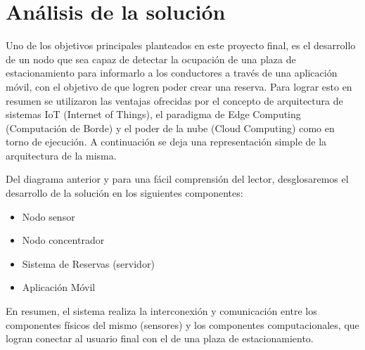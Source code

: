 \newpage
\section{Análisis de la solución}
Uno de los objetivos principales planteados en este proyecto final, es el desarrollo de un nodo que sea capaz de detectar la ocupación de una plaza de estacionamiento para informarlo a los conductores a través de una aplicación móvil, con el objetivo de que logren poder crear una reserva. Para lograr esto en resumen se utilizaron las ventajas ofrecidas por el concepto de arquitectura de sistemas IoT (Internet of Things), el paradigma de Edge Computing (Computación de Borde) y el poder de la nube (Cloud Computing) como en torno de ejecución. A continuación se deja una representación simple de la arquitectura de la misma.


Del diagrama anterior y para una fácil comprensión del lector, desglosaremos el desarrollo de la solución en los siguientes componentes:

\begin{itemize}
    \item Nodo sensor
    \item Nodo concentrador
    \item Sistema de Reservas (servidor)
    \item Aplicación Móvil
\end{itemize}

En resumen, el sistema realiza la interconexión y comunicación entre los componentes físicos del mismo (sensores) y los componentes computacionales, que logran conectar al usuario final con el de una plaza de estacionamiento.








